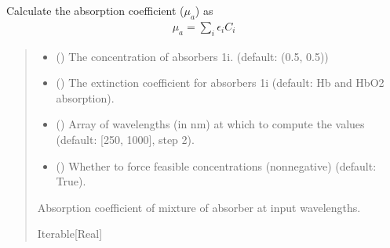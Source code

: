 \documentclass[letterpaper,10pt,english]{sphinxmanual}
\begin{document}
\begin{fulllineitems}
{}
\pysigstopsignatures
\sphinxAtStartPar
Calculate the absorption coefficient (\(\mu_a\)) as
\begin{equation*}
\begin{split}\mu_a = \sum_i\epsilon_iC_i\end{split}
\end{equation*}\begin{quote}\begin{description}
\begin{itemize}
\item {} 
\sphinxAtStartPar
{} (\sphinxstyleliteralemphasis{\sphinxupquote{{[}}}\sphinxstyleliteralemphasis{\sphinxupquote{{]}}}) \textendash{} The concentration of absorbers 1\sphinxhyphen{}i. (default: (0.5, 0.5))

\item {} 
\sphinxAtStartPar
{} (\sphinxstyleliteralemphasis{\sphinxupquote{{[}}}\sphinxstyleliteralemphasis{\sphinxupquote{{]}}}) \textendash{} The extinction coefficient for absorbers 1\sphinxhyphen{}i (default: Hb and HbO2 absorption).

\item {} 
\sphinxAtStartPar
{} (\sphinxstyleliteralemphasis{\sphinxupquote{{[}}}\sphinxstyleliteralemphasis{\sphinxupquote{{]}}}) \textendash{} Array of wavelengths (in nm) at which to compute the values (default: {[}250, 1000{]}, step 2).

\item {} 
\sphinxAtStartPar
{} () \textendash{} Whether to force feasible concentrations (non\sphinxhyphen{}negative) (default: True).

\end{itemize}

\sphinxAtStartPar
Absorption coefficient of mixture of absorber at input wavelengths.

\sphinxAtStartPar
Iterable{[}Real{]}

\end{description}\end{quote}

\end{fulllineitems}
\end{document}
